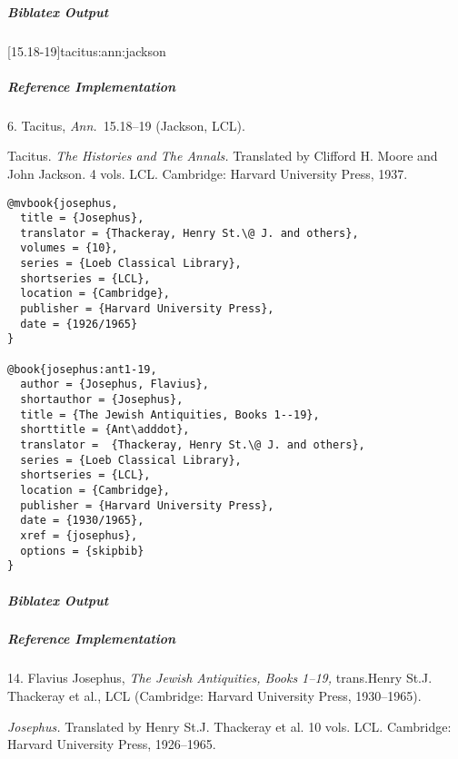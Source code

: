 \documentclass[a4paper]{article}
\newenvironment{biboutput}{%
  \subparagraph{Biblatex Output}
}{\color{black}}
\newenvironment{refimp}{%
  \subparagraph{Reference Implementation}
  \color{reference-colour}
  \rm
}{\par\color{black}}
\begin{document}
\begin{biboutput}
  [15.18-19]{tacitus:ann:jackson}
\end{biboutput}

\begin{refimp}
  \hspace*{\bibindent}6. Tacitus, \emph{Ann.}\ 15.18–19 (Jackson, LCL).

  \hangindent\bibindent Tacitus. \emph{The Histories and The Annals.}
  Translated by Clifford H. Moore and John Jackson. 4 vols. LCL. Cambridge:
  Harvard University Press, 1937.

\end{refimp}

\medskip

\begin{lstlisting}
@mvbook{josephus,
  title = {Josephus},
  translator = {Thackeray, Henry St.\@ J. and others},
  volumes = {10},
  series = {Loeb Classical Library},
  shortseries = {LCL},
  location = {Cambridge},
  publisher = {Harvard University Press},
  date = {1926/1965}
}

@book{josephus:ant1-19,
  author = {Josephus, Flavius},
  shortauthor = {Josephus},
  title = {The Jewish Antiquities, Books 1--19},
  shorttitle = {Ant\adddot},
  translator =  {Thackeray, Henry St.\@ J. and others},
  series = {Loeb Classical Library},
  shortseries = {LCL},
  location = {Cambridge},
  publisher = {Harvard University Press},
  date = {1930/1965},
  xref = {josephus},
  options = {skipbib}
}
\end{lstlisting}

\begin{biboutput}
\end{biboutput}

\begin{refimp}
  \hspace*{\bibindent}14. Flavius Josephus, \emph{The Jewish Antiquities,
  Books 1–19,} trans.\@ Henry St.\@ J. Thackeray et al., LCL (Cambridge:
  Harvard University Press, 1930–1965).

  \hangindent\bibindent \emph{Josephus.} Translated by Henry St.\@ J. Thackeray
  et al. 10 vols. LCL. Cambridge: Harvard University Press, 1926–1965.

\end{refimp}
\end{document}
